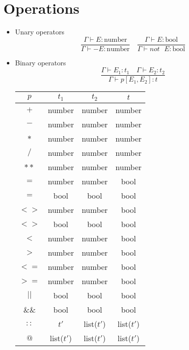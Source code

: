 \documentclass[]{article}
\begin{document}
	\section{Operations}
		\begin{itemize}
			\item Unary operators
			\[
			\frac{\Gamma \vdash E: \text{number}}{\Gamma \vdash -E: \text{number}} \quad
			\frac{\Gamma \vdash E: \text{bool}}{\Gamma \vdash not \text{ } E: \text{bool}}
			\]
			\item Binary operators
			\[
			\frac{\Gamma \vdash E_1: t_1 \quad \Gamma \vdash E_2: t_2}{\Gamma \vdash p[E_1,E_2]: t}
			\]
			\begin{center}
				\begin{tabular}{| c || c | c | c |} 
					\hline
					$p$ & $t_1$ & $t_2$ & $t$ \\ [0.5ex] 
					\hline\hline
					$+$ & number & number & number \\ 
					\hline
					$-$ & number & number & number \\ 
					\hline
					$*$ & number & number & number \\ 
					\hline
					$/$ & number & number & number \\ 
					\hline
					$**$ & number & number & number \\ 
					\hline
					$=$ & number & number & bool \\ 
					\hline
					$=$ & bool & bool & bool \\ 
					\hline
					$<>$ & number & number & bool \\ 
					\hline
					$<>$ & bool & bool & bool \\ 
					\hline
					$<$ & number & number & bool \\ 
					\hline
					$>$ & number & number & bool \\ 
					\hline
					$<=$ & number & number & bool \\ 
					\hline
					$>=$ & number & number & bool \\ 
					\hline
					$||$ & bool & bool & bool \\ 
					\hline
					$\&\&$ & bool & bool & bool \\  
					\hline
					$::$ & $t'$ & list($t'$) & list($t'$) \\  
					\hline
					$@$ & list($t'$) & list($t'$) & list($t'$) \\  
					\hline
				\end{tabular}
			\end{center}
		\end{itemize}
	
\end{document}

